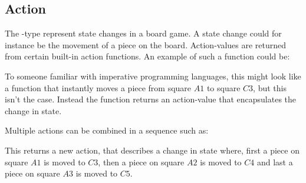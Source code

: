 
\subsection{Action}

The -type represent state changes in a board game. A state change could for instance be the movement
of a piece on the board. Action-values are returned from certain built-in action functions. An example
of such a function could be:


To someone familiar with imperative programming languages, this might look like a function that
instantly moves a piece from square $A1$ to square $C3$, but this isn't the case. Instead the
function returns an action-value that encapsulates the change in state.

Multiple actions can be combined in a sequence such as:


This returns a new action, that describes a change in state where, first a piece on square $A1$
is moved to $C3$, then a piece on square $A2$ is moved to $C4$ and last a piece on square $A3$
is moved to $C5$.



